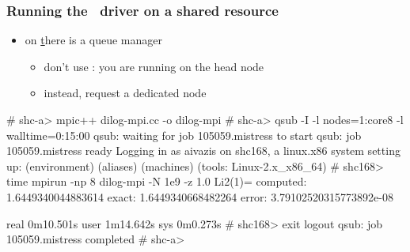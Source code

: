 \begin{frame}[fragile]
%
  \frametitle{Running the \mpi\ driver on a shared resource}
%
  \begin{itemize}
  \item on \href{shc.cacr.caltech.edu} there is a queue manager
    \begin{itemize}
    \item don't use : you are running on the head node
    \item instead, request a dedicated node
    \end{itemize}
  \end{itemize}
%
  \begin{shell}{}
# shc-a> mpic++ dilog-mpi.cc -o dilog-mpi
# shc-a> qsub -I -l nodes=1:core8 -l walltime=0:15:00
qsub: waiting for job 105059.mistress to start
qsub: job 105059.mistress ready
Logging in as aivazis on shc168, a linux.x86 system
  setting up: (environment) (aliases) (machines) (tools: Linux-2.x_x86_64)
# shc168> time mpirun -np 8 dilog-mpi -N 1e9 -z 1.0
Li2(1)=
 computed: 1.6449340044883614
    exact: 1.6449340668482264
    error: 3.79102520315773892e-08

real    0m10.501s
user    1m14.642s
sys     0m0.273s
# shc168> exit
logout
qsub: job 105059.mistress completed
# shc-a>
  \end{shell}
%
\end{frame}

